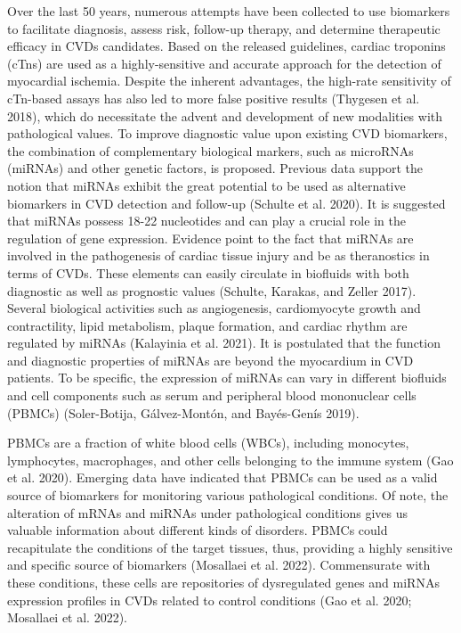\documentclass[smallextended]{svjour3}       %
\begin{document}
Over the last 50 years, numerous attempts have been collected to use
biomarkers to facilitate diagnosis, assess risk, follow-up therapy, and
determine therapeutic efficacy in CVDs candidates. Based on the released
guidelines, cardiac troponins (cTns) are used as a highly-sensitive and
accurate approach for the detection of myocardial ischemia. Despite the
inherent advantages, the high-rate sensitivity of cTn-based assays has
also led to more false positive results (Thygesen et al. 2018), which do
necessitate the advent and development of new modalities with
pathological values. To improve diagnostic value upon existing CVD
biomarkers, the combination of complementary biological markers, such as
microRNAs (miRNAs) and other genetic factors, is proposed. Previous data
support the notion that miRNAs exhibit the great potential to be used as
alternative biomarkers in CVD detection and follow-up (Schulte et al.
2020). It is suggested that miRNAs possess 18-22 nucleotides and can
play a crucial role in the regulation of gene expression. Evidence point
to the fact that miRNAs are involved in the pathogenesis of cardiac
tissue injury and be as theranostics in terms of CVDs. These elements
can easily circulate in biofluids with both diagnostic as well as
prognostic values (Schulte, Karakas, and Zeller 2017). Several
biological activities such as angiogenesis, cardiomyocyte growth and
contractility, lipid metabolism, plaque formation, and cardiac rhythm
are regulated by miRNAs (Kalayinia et al. 2021). It is postulated that
the function and diagnostic properties of miRNAs are beyond the
myocardium in CVD patients. To be specific, the expression of miRNAs can
vary in different biofluids and cell components such as serum and
peripheral blood mononuclear cells (PBMCs) (Soler-Botija, Gálvez-Montón,
and Bayés-Genís 2019).

PBMCs are a fraction of white blood cells (WBCs), including monocytes,
lymphocytes, macrophages, and other cells belonging to the immune system
(Gao et al. 2020). Emerging data have indicated that PBMCs can be used
as a valid source of biomarkers for monitoring various pathological
conditions. Of note, the alteration of mRNAs and miRNAs under
pathological conditions gives us valuable information about different
kinds of disorders. PBMCs could recapitulate the conditions of the
target tissues, thus, providing a highly sensitive and specific source
of biomarkers (Mosallaei et al. 2022). Commensurate with these
conditions, these cells are repositories of dysregulated genes and
miRNAs expression profiles in CVDs related to control conditions (Gao et
al. 2020; Mosallaei et al. 2022).
\end{document}
